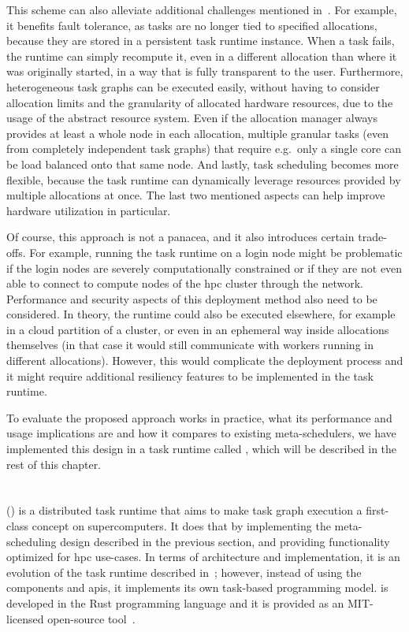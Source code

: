 This scheme can also alleviate additional challenges mentioned in~. For
example, it benefits fault tolerance, as tasks are no longer tied to specified allocations, because
they are stored in a persistent task runtime instance. When a task fails, the runtime can simply
recompute it, even in a different allocation than where it was originally started, in a way that is
fully transparent to the user. Furthermore, heterogeneous task graphs can be executed easily,
without having to consider allocation limits and the granularity of allocated hardware resources,
due to the usage of the abstract resource system. Even if the allocation manager always provides at
least a whole node in each allocation, multiple granular tasks (even from completely independent
task graphs) that require e.g.\ only a single core can be load balanced onto that same node. And
lastly, task scheduling becomes more flexible, because the task runtime can dynamically leverage
resources provided by multiple allocations at once. The last two mentioned aspects can help improve
hardware utilization in particular.

Of course, this approach is not a panacea, and it also introduces certain trade-offs. For example,
running the task runtime on a login node might be problematic if the login nodes are severely
computationally constrained or if they are not even able to connect to compute nodes of the
\gls{hpc} cluster through the network. Performance and security aspects of this
deployment method also need to be considered. In theory, the runtime could also be executed
elsewhere, for example in a cloud partition of a cluster, or even in an ephemeral way inside
allocations themselves (in that case it would still communicate with workers running in different
allocations). However, this would complicate the deployment process and it might require additional
resiliency features to be implemented in the task runtime.

To evaluate the proposed approach works in practice, what its performance and usage implications
are and how it compares to existing meta-schedulers, we have implemented this design in a task
runtime called \hyperqueue{}, which will be described in the rest of this chapter.

\section{\hyperqueue{}}
\hyperqueue{} (\hq{}) is a distributed task runtime that aims to make task graph execution a
first-class concept on supercomputers. It does that by implementing the meta-scheduling design
described in the previous section, and providing functionality optimized for
\gls{hpc} use-cases. In terms of architecture and implementation, it is an evolution
of the \rsds{} task runtime described in~; however, instead
of using the \dask{} components and \glspl{api}, it implements its own
task-based programming model. \hyperqueue{} is developed in the Rust programming language
and it is provided as an \mbox{MIT-licensed} open-source tool~\cite{hq_github}.

